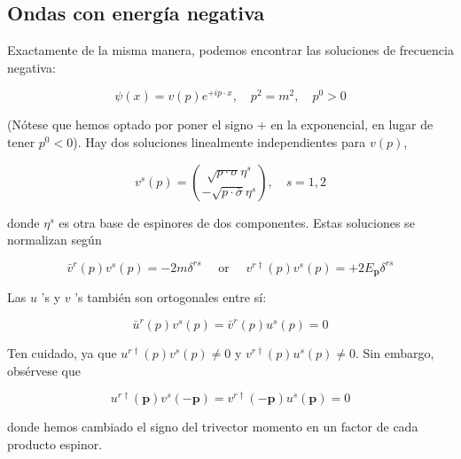 \subsection{Ondas con energía negativa}
Exactamente de la misma manera, podemos encontrar las soluciones de frecuencia negativa:

\begin{equation*}
\psi(x)=v(p) e^{+i p \cdot x}, \quad p^{2}=m^{2}, \quad p^{0}>0 \tag{3.61}
\end{equation*}

(Nótese que hemos optado por poner el signo + en la exponencial, en lugar de tener $p^{0}<0$). Hay dos soluciones linealmente independientes para $v(p)$,

\begin{equation*}
v^{s}(p)=\binom{\sqrt{p \cdot \sigma} \eta^{s}}{-\sqrt{p \cdot \bar{\sigma}} \eta^{s}}, \quad s=1,2 \tag{3.62}
\end{equation*}

donde $\eta^{s}$ es otra base de espinores de dos componentes. Estas soluciones se normalizan según

\begin{equation*}
\bar{v}^{r}(p) v^{s}(p)=-2 m \delta^{r s} \quad \text { or } \quad v^{r \dagger}(p) v^{s}(p)=+2 E_{\mathbf{p}} \delta^{r s} \tag{3.63}
\end{equation*}


Las $u$ 's y $v$ 's también son ortogonales entre sí:

\begin{equation*}
\bar{u}^{r}(p) v^{s}(p)=\bar{v}^{r}(p) u^{s}(p)=0 \tag{3.64}
\end{equation*}


Ten cuidado, ya que $u^{r \dagger}(p) v^{s}(p) \neq 0$ y $v^{r \dagger}(p) u^{s}(p) \neq 0$. Sin embargo, obsérvese que

\begin{equation*}
u^{r \dagger}(\mathbf{p}) v^{s}(-\mathbf{p})=v^{r \dagger}(-\mathbf{p}) u^{s}(\mathbf{p})=0 \tag{3.65}
\end{equation*}

donde hemos cambiado el signo del trivector momento en un factor de cada producto espinor.
